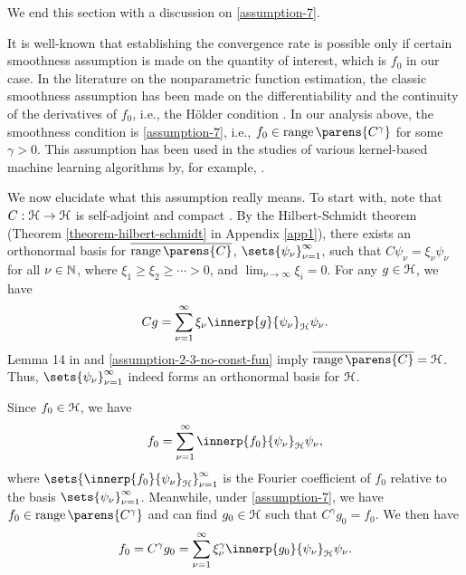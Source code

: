 We end this section with a discussion on \ref{assumption-7}. 

It is well-known that establishing the convergence rate is possible only if certain smoothness assumption is made on the quantity of interest, which is $f_0$ in our case. In the literature on the nonparametric function estimation, the classic smoothness assumption has been made on the differentiability and the continuity of the derivatives of $f_0$, i.e., the H{\"o}lder condition \parencite[see, for example, Chapter 1 in][]{Tsybakov2009-vp}. In our analysis above, the smoothness condition is \ref{assumption-7}, i.e., $f_0 \in \range \parens{C^{\gamma}}$ for some $\gamma > 0$. This assumption has been used in the studies of various kernel-based machine learning algorithms by, for example, \textcite{Caponnetto2006-mk, Bauer2007-xq, Smale2007-nm, Yao2007-ji, Lo_Gerfo2008-vv, Rastogi2017-tq, Lin2018-ig}. 

We now elucidate what this assumption really means. To start with, note that $C: \mathcal{H} \to \mathcal{H}$ is self-adjoint and compact \parencite[Theorem 4(i) in][]{Sriperumbudur-density-estimation-inf-exp-family}. By the Hilbert-Schmidt theorem (Theorem \ref{theorem-hilbert-schmidt} in Appendix \ref{app1}), there exists an orthonormal basis for $\overline{\range \parens{C}}$, $\sets{\psi_{\nu}}_{\nu=1}^{\infty}$, such that $C \psi_{\nu} = \xi_{\nu} \psi_{\nu}$ for all $\nu \in \mathbb{N}$, where $\xi_1 \ge \xi_2 \ge \cdots > 0$, and $\lim_{\nu \to \infty} \xi_i = 0$. For any $g \in \mathcal{H}$, we have 
\begin{align*}
	C g = \sum_{\nu=1}^\infty \xi_{\nu} \innerp{g}{\psi_{\nu}}_{\calH} \psi_{\nu}. 
\end{align*}
Lemma 14 in \textcite{Sriperumbudur-density-estimation-inf-exp-family} and \ref{assumption-2-3-no-const-fun} imply $\overline{\range \parens{C}} = \calH$. Thus, $\sets{\psi_{\nu}}_{\nu=1}^{\infty}$ indeed forms an orthonormal basis for $\mathcal{H}$. %

Since $f_0 \in \mathcal{H}$, we have 
\begin{align}\label{eq-source-condition-2}
	f_0 = \sum_{\nu=1}^\infty \innerp{f_0}{\psi_{\nu}}_{\calH} \psi_{\nu}, 
\end{align}
where $\sets{\innerp{f_0}{\psi_{\nu}}_{\calH}}_{\nu=1}^\infty$ is the Fourier coefficient of $f_0$ relative to the basis $\sets{\psi_{\nu}}_{\nu=1}^\infty$. Meanwhile, under \ref{assumption-7}, we have $f_0 \in \range \parens{C^{\gamma}}$ and can find $g_0 \in \mathcal{H}$ such that $C^{\gamma} g_0 = f_0$. We then have 
\begin{align}\label{eq-source-condition-1}
	f_0 = C^\gamma g_0 = \sum_{\nu=1}^\infty \xi_{\nu}^\gamma \innerp{g_0}{\psi_{\nu}}_{\calH} \psi_{\nu}. 
\end{align}


